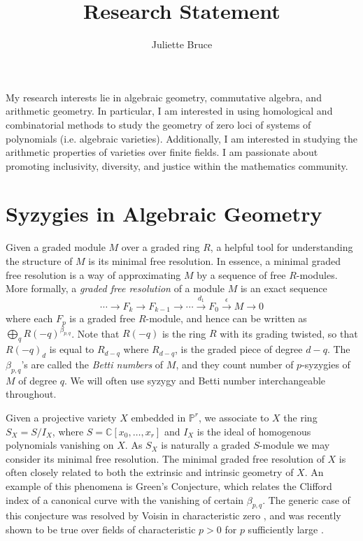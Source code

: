 \documentclass[10pt,reqno]{amsart}
\title{Research Statement}
\author{Juliette Bruce}
\theoremstyle{remark}
\newcommand{\C}{\mathbb{C}}
\renewcommand{\P}{\mathbb{P}}
\begin{document}
 

\maketitle



\setcounter{section}{1}

My research interests lie in algebraic geometry, commutative algebra, and arithmetic geometry. In particular, I am interested in using homological and combinatorial methods to study the geometry of zero loci of systems of polynomials (i.e. algebraic varieties). Additionally, I am interested in studying the arithmetic properties of varieties over finite fields. I am passionate about promoting inclusivity, diversity, and justice within the mathematics community.

\section{Syzygies in Algebraic Geometry}

Given a graded module $M$ over a graded ring $R$, a helpful tool for understanding the structure of $M$ is its minimal free resolution. In essence, a minimal graded free resolution is a way of approximating $M$ by a sequence of free $R$-modules. More formally, a \textit{graded free resolution} of a module $M$ is an exact sequence 
\[
\cdots \xrightarrow{} F_{k} \xrightarrow{} F_{k-1} \xrightarrow{} \cdots \xrightarrow{d_{1}} F_{0}\xrightarrow{\epsilon}M\xrightarrow{} 0
\]
where each $F_{p}$ is a graded free $R$-module, and hence can be written as $\bigoplus_{q}R(-q)^{\beta_{p,q}}$. Note that $R(-q)$ is the ring $R$ with its grading twisted, so that $R(-q)_{d}$ is equal to $R_{d-q}$ where $R_{d-q}$, is the graded piece of degree $d-q$. The $\beta_{p,q}$'s are called the \textit{Betti numbers} of $M$, and they count number of $p$-syzygies of $M$ of degree $q$. We will often use syzygy and Betti number interchangeable throughout. 

Given a projective variety $X$ embedded in $\P^r$, we associate to $X$ the ring $S_X=S/I_X$, where $S=\C[x_0,\ldots,x_r]$ and $I_X$ is the ideal of homogenous polynomials vanishing on $X$. As $S_X$ is naturally a graded $S$-module we may consider its minimal free resolution. The minimal graded free resolution of $X$ is often closely related to both the extrinsic and intrinsic geometry of $X$.  An example of this phenomena
 is Green's Conjecture, which relates the Clifford index of a canonical curve with the vanishing of certain $\beta_{p,q}$. The generic case of this conjecture was resolved by Voisin in characteristic zero \cite{voisin02, voisin05}, and was recently shown to be true over fields of characteristic $p>0$ for $p$ sufficiently large \cite{aproduFarkas19}.
\end{document}
